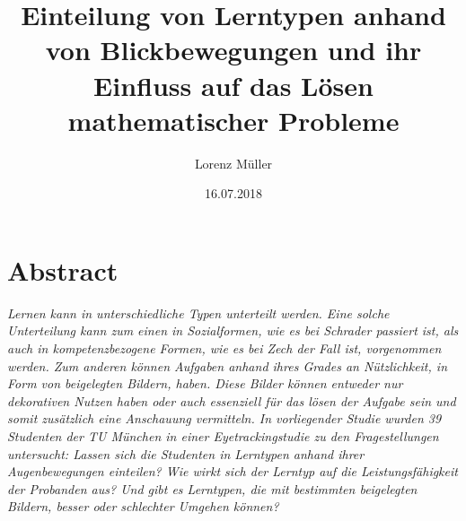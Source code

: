%
% 
% 
%



\renewcommand{\Thema}{%
    Einteilung von Lerntypen anhand von Blickbewegungen und ihr Einfluss auf das Lösen 
    mathematischer Probleme}






\title{Einteilung von Lerntypen anhand von Blickbewegungen und ihr Einfluss auf das Lösen 
        mathematischer Probleme}
\author{Lorenz Müller}
\date{16.07.2018}


\section*{Abstract}

\textit{Lernen kann in unterschiedliche Typen unterteilt werden. Eine solche Unterteilung kann zum einen in Sozialformen, wie es bei Schrader passiert ist, als auch in kompetenzbezogene Formen, wie es bei Zech der Fall ist, vorgenommen werden. Zum anderen können Aufgaben anhand ihres Grades an Nützlichkeit, in Form von beigelegten Bildern, haben. Diese Bilder können entweder nur dekorativen Nutzen haben oder auch essenziell für das lösen der Aufgabe sein und somit zusätzlich eine Anschauung vermitteln. In vorliegender Studie wurden 39 Studenten der TU München in einer Eyetrackingstudie zu den Fragestellungen untersucht: Lassen sich die Studenten in Lerntypen anhand ihrer Augenbewegungen einteilen? Wie wirkt sich der Lerntyp auf die Leistungsfähigkeit der Probanden aus? Und gibt es Lerntypen, die mit bestimmten beigelegten Bildern, besser oder schlechter Umgehen können?}

